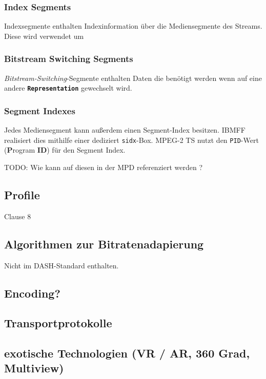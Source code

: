 \documentclass[paper = a4, fontsize = 12pt, parskip = half]{scrartcl} %
\def\attr#1{\texttt{#1}}
\def\elem#1{\texttt{\textbf{#1}}}
\begin{document}
\subsubsection{Index Segments}
Indexsegmente enthalten Indexinformation über die Mediensegmente des Streams. Diese wird verwendet um 

\subsubsection{Bitstream Switching Segments}
\textit{Bitstream-Switching}-Segmente enthalten Daten die benötigt werden wenn auf eine andere \elem{Representation} gewechselt wird.

\subsubsection{Segment Indexes}
Jedes Mediensegment kann außerdem einen Segment-Index besitzen. IBMFF realisiert dies mithilfe einer dediziert \attr{sidx}-Box. MPEG-2 TS nutzt den \attr{PID}-Wert (\textbf{P}rogram \textbf{ID}) für den Segment Index.

TODO: Wie kann auf diesen in der MPD referenziert werden ?


\subsection{Profile}
\label{profiles}
Clause 8

\subsection{Algorithmen zur Bitratenadapierung}

Nicht im DASH-Standard enthalten.

\subsection{Encoding?}

\subsection{Transportprotokolle}

\subsection{exotische Technologien (VR / AR, 360 Grad, Multiview)}




\printbibliography
\end{document}
